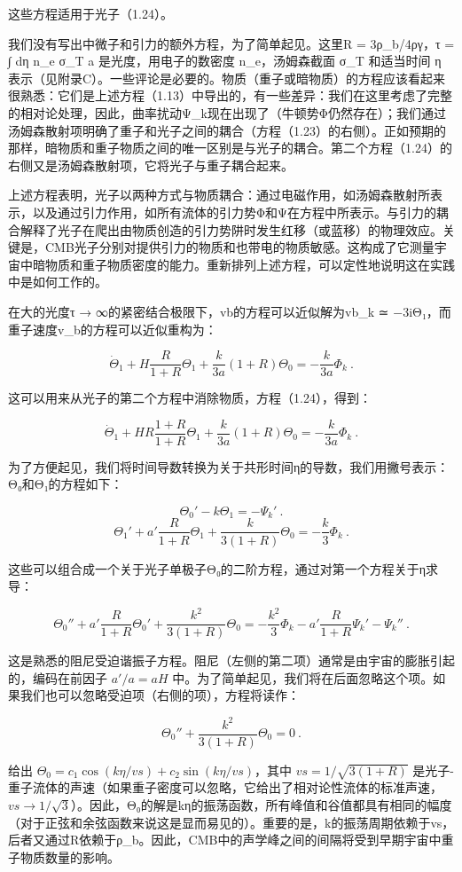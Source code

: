 {这些方程适用于光子（1.24）。

我们没有写出中微子和引力的额外方程，为了简单起见。这里R = 3ρ_b/4ργ，τ = ∫ dη n_e σ_T a 是光度，用电子的数密度 n_e，汤姆森截面 σ_T 和适当时间 η 表示（见附录C）。一些评论是必要的。物质（重子或暗物质）的方程应该看起来很熟悉：它们是上述方程（1.13）中导出的，有一些差异：我们在这里考虑了完整的相对论处理，因此，曲率扰动Ψ_k现在出现了（牛顿势Φ仍然存在）；我们通过汤姆森散射项明确了重子和光子之间的耦合（方程（1.23）的右侧）。正如预期的那样，暗物质和重子物质之间的唯一区别是与光子的耦合。第二个方程（1.24）的右侧又是汤姆森散射项，它将光子与重子耦合起来。

上述方程表明，光子以两种方式与物质耦合：通过电磁作用，如汤姆森散射所表示，以及通过引力作用，如所有流体的引力势Φ和Ψ在方程中所表示。与引力的耦合解释了光子在爬出由物质创造的引力势阱时发生红移（或蓝移）的物理效应。关键是，CMB光子分别对提供引力的物质和也带电的物质敏感。这构成了它测量宇宙中暗物质和重子物质密度的能力。重新排列上述方程，可以定性地说明这在实践中是如何工作的。

在大的光度τ → ∞的紧密结合极限下，vb的方程可以近似解为vb_k ≃ −3iΘ₁，而重子速度v_b的方程可以近似重构为：

\[ \dot{\Theta}_1 + H \frac{R}{1 + R} \Theta_1 + \frac{k}{3a} (1 + R) \Theta_0 = -\frac{k}{3a} \Phi_k~. \]

这可以用来从光子的第二个方程中消除物质，方程（1.24），得到：

\[ \dot{\Theta}_1 + H R \frac{1 + R}{1 + R} \Theta_1 + \frac{k}{3a} (1 + R) \Theta_0 = -\frac{k}{3a} \Phi_k ~.\]

为了方便起见，我们将时间导数转换为关于共形时间η的导数，我们用撇号表示：Θ₀和Θ₁的方程如下：

\[ \Theta_0' - k \Theta_1 = -\Psi_k'~. \]
\[ \Theta_1' + a' \frac{R}{1 + R} \Theta_1 + \frac{k}{3(1 + R)} \Theta_0 = -\frac{k}{3} \Phi_k~. \]

这些可以组合成一个关于光子单极子Θ₀的二阶方程，通过对第一个方程关于η求导：

\[ \Theta_0'' + a' \frac{R}{1 + R} \Theta_0' + \frac{k^2}{3(1 + R)} \Theta_0 = -\frac{k^2}{3} \Phi_k - a' \frac{R}{1 + R} \Psi_k' - \Psi_k''~. \]

这是熟悉的阻尼受迫谐振子方程。阻尼（左侧的第二项）通常是由宇宙的膨胀引起的，编码在前因子 \( a'/a = aH \) 中。为了简单起见，我们将在后面忽略这个项。如果我们也可以忽略受迫项（右侧的项），方程将读作：

\[ \Theta_0'' + \frac{k^2}{3(1 + R)} \Theta_0 = 0~. \]

给出 \( \Theta_0 = c_1 \cos(k\eta/vs) + c_2 \sin(k\eta/vs) \)，其中 \( vs = 1/\sqrt{3(1 + R)} \) 是光子-重子流体的声速（如果重子密度可以忽略，它给出了相对论性流体的标准声速，\( vs \rightarrow 1/\sqrt{3} \)）。因此，Θ₀的解是kη的振荡函数，所有峰值和谷值都具有相同的幅度（对于正弦和余弦函数来说这是显而易见的）。重要的是，k的振荡周期依赖于vs，后者又通过R依赖于ρ_b。因此，CMB中的声学峰之间的间隔将受到早期宇宙中重子物质数量的影响。

}
